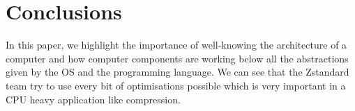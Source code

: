 \documentclass{sig-alternate-05-2015}
\begin{document}
\section{Conclusions}
    In this paper, we highlight the importance of well-knowing the architecture of a computer and
    how computer components are working below all the abstractions given by the OS and the
    programming language. We can see that the Zstandard team try to use every bit of optimisations
    possible which is very important in a CPU heavy application like compression.

%
% 

%
%
\end{document}
